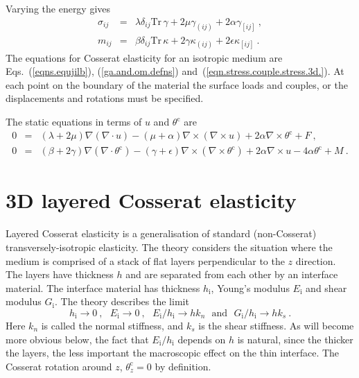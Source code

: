 \documentclass[]{scrreprt}
\newcommand{\si}{\sigma}
\newcommand{\thetac}{\theta^{\mathrm{c}}}
\newcommand{\ep}{\epsilon}
\newcommand{\ga}{\gamma}
\newcommand{\non}{\nonumber}
\newcommand{\de}{\delta}
\newcommand{\ka}{\kappa}
\newcommand{\la}{\lambda}
\newcommand{\tr}{\mbox{Tr}\,}
\newcommand{\al}{\alpha}
\newcommand{\be}{\beta}
\newcommand{\cd}{\cdot}
\begin{document}
Varying the energy gives
\begin{eqnarray}
\si_{ij} & = & \la\de_{ij}\tr\ga + 2\mu\ga_{(ij)} + 2\al\ga_{[ij]} \ ,
\non \\
m_{ij} & = & \be\de_{ij}\tr\ka + 2\ga\ka_{(ij)} + 2\ep\ka_{[ij]} \ .
\label{eqn.stress.couple.stress.3d.}
\end{eqnarray}
The equations for Cosserat elasticity for an isotropic medium are
Eqs.~(\ref{eqns.equjilb}), (\ref{ga.and.om.defns})
and~(\ref{eqn.stress.couple.stress.3d.}).  At each point on the
boundary of the material the surface loads and couples, or the
displacements and rotations must be specified.

The static equations in terms of $u$ and $\thetac$ are
\begin{eqnarray*}
0 & = & (\la+2\mu)\nabla(\nabla\cd u) -
(\mu+\al)\nabla\times(\nabla\times u) + 2\al\nabla\times\thetac + F
\ , \\
0 & = & (\be+2\ga)\nabla(\nabla\cd\thetac) -
(\ga+\ep)\nabla\times(\nabla\times\thetac) + 2\al\nabla\times u -
4\al\thetac + M \ .
\end{eqnarray*}


\chapter{3D layered Cosserat elasticity}

Layered Cosserat elasticity is a generalisation of standard
(non-Cosserat) transversely-isotropic elasticity.  The theory
considers the situation where the medium is comprised of a stack of
flat layers perpendicular to the $z$ direction.  The layers have
thickness $h$ and are separated from each other by an interface
material.  The interface material has thickness $h_{\mathrm{i}}$,
Young's modulus $E_{\mathrm{i}}$ and shear modulus $G_{\mathrm{i}}$.
The theory describes the limit 
\begin{equation}
h_{\mathrm{i}} \rightarrow 0 \ , \ \ \ 
E_{\mathrm{i}} \rightarrow 0 \ , \ \ \ 
E_{\mathrm{i}}/h_{\mathrm{i}} \rightarrow hk_{n} \ \ \ \mbox{and}
\ \ \ 
G_{\mathrm{i}}/h_{\mathrm{i}} \rightarrow hk_{s} \ .
\label{thin.layer.limits.eqn}
\end{equation}
Here $k_{n}$ is called the normal stiffness, and $k_{s}$ is the shear
stiffness.  As will become more obvious below, the fact that
$E_{\mathrm{i}}/h_{\mathrm{i}}$ depends on $h$ is natural, since the
thicker the layers, the less important the macroscopic effect on the
thin interface.  The Cosserat rotation around $z$, $\thetac_{z}=0$ by
definition.
\end{document}

